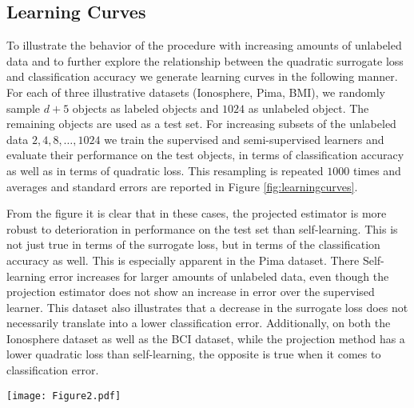 \documentclass{article}
\begin{document}
\subsection{Learning Curves}
To illustrate the behavior of the procedure with increasing amounts of unlabeled data and to further explore the relationship between the quadratic surrogate loss and classification accuracy we generate learning curves in the following manner. For each of three illustrative datasets (Ionosphere, Pima, BMI), we randomly sample $d+5$ objects as labeled objects and $1024$ as unlabeled object. The remaining objects are used as a test set. For increasing subsets of the unlabeled data $2,4,8,\dots,1024$ we train the supervised and semi-supervised learners and evaluate their performance on the test objects, in terms of classification accuracy as well as in terms of quadratic loss. This resampling is repeated $1000$ times and averages and standard errors are reported in Figure \ref{fig:learningcurves}.

From the figure it is clear that in these cases, the projected estimator is more robust to deterioration in performance on the test set than self-learning. This is not just true in terms of the surrogate loss, but in terms of the classification accuracy as well. This is especially apparent in the Pima dataset. There Self-learning error increases for larger amounts of unlabeled data, even though the projection estimator does not show an increase in error over the supervised learner. This dataset also illustrates that a decrease in the surrogate loss does not necessarily translate into a lower classification error. Additionally, on both the Ionosphere dataset as well as the BCI dataset, while the projection method has a lower quadratic loss than self-learning, the opposite is true when it comes to classification error.

\begin{figure*}
\centering
\texttt{[image: Figure2.pdf]}
\caption{Learning curves in terms of classification errors and quadratic loss on the test set for increasing numbers of \emph{unlabeled} data. LS indicates the least squares classifier trained on only the labeled objects while LSoracle indicates the performance of the least squares classifier when all labels of the unlabeled objects are available. Projection is the approach described in Section \ref{Projections}. Self-Learning acts as a basic semi-supervised comparison.}
\label{fig:learningcurves}
\end{figure*}
\end{document}
